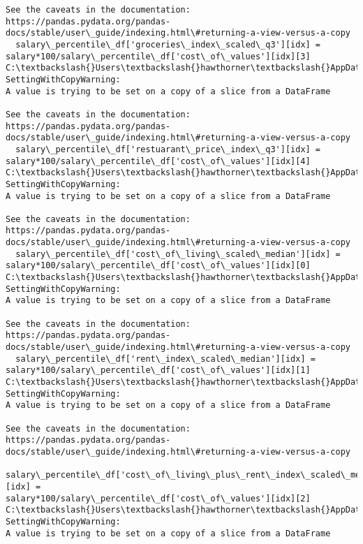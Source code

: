 \documentclass[11pt]{article}
\begin{document}
\begin{Verbatim}[commandchars=\\\{\}]
See the caveats in the documentation: https://pandas.pydata.org/pandas-
docs/stable/user\_guide/indexing.html\#returning-a-view-versus-a-copy
  salary\_percentile\_df['groceries\_index\_scaled\_q3'][idx] =
salary*100/salary\_percentile\_df['cost\_of\_values'][idx][3]
C:\textbackslash{}Users\textbackslash{}hawthorner\textbackslash{}AppData\textbackslash{}Local\textbackslash{}Temp\textbackslash{}ipykernel\_22188\textbackslash{}773068333.py:33:
SettingWithCopyWarning:
A value is trying to be set on a copy of a slice from a DataFrame

See the caveats in the documentation: https://pandas.pydata.org/pandas-
docs/stable/user\_guide/indexing.html\#returning-a-view-versus-a-copy
  salary\_percentile\_df['restuarant\_price\_index\_q3'][idx] =
salary*100/salary\_percentile\_df['cost\_of\_values'][idx][4]
C:\textbackslash{}Users\textbackslash{}hawthorner\textbackslash{}AppData\textbackslash{}Local\textbackslash{}Temp\textbackslash{}ipykernel\_22188\textbackslash{}773068333.py:37:
SettingWithCopyWarning:
A value is trying to be set on a copy of a slice from a DataFrame

See the caveats in the documentation: https://pandas.pydata.org/pandas-
docs/stable/user\_guide/indexing.html\#returning-a-view-versus-a-copy
  salary\_percentile\_df['cost\_of\_living\_scaled\_median'][idx] =
salary*100/salary\_percentile\_df['cost\_of\_values'][idx][0]
C:\textbackslash{}Users\textbackslash{}hawthorner\textbackslash{}AppData\textbackslash{}Local\textbackslash{}Temp\textbackslash{}ipykernel\_22188\textbackslash{}773068333.py:38:
SettingWithCopyWarning:
A value is trying to be set on a copy of a slice from a DataFrame

See the caveats in the documentation: https://pandas.pydata.org/pandas-
docs/stable/user\_guide/indexing.html\#returning-a-view-versus-a-copy
  salary\_percentile\_df['rent\_index\_scaled\_median'][idx] =
salary*100/salary\_percentile\_df['cost\_of\_values'][idx][1]
C:\textbackslash{}Users\textbackslash{}hawthorner\textbackslash{}AppData\textbackslash{}Local\textbackslash{}Temp\textbackslash{}ipykernel\_22188\textbackslash{}773068333.py:39:
SettingWithCopyWarning:
A value is trying to be set on a copy of a slice from a DataFrame

See the caveats in the documentation: https://pandas.pydata.org/pandas-
docs/stable/user\_guide/indexing.html\#returning-a-view-versus-a-copy
  salary\_percentile\_df['cost\_of\_living\_plus\_rent\_index\_scaled\_median'][idx] =
salary*100/salary\_percentile\_df['cost\_of\_values'][idx][2]
C:\textbackslash{}Users\textbackslash{}hawthorner\textbackslash{}AppData\textbackslash{}Local\textbackslash{}Temp\textbackslash{}ipykernel\_22188\textbackslash{}773068333.py:40:
SettingWithCopyWarning:
A value is trying to be set on a copy of a slice from a DataFrame


\end{Verbatim}
\end{document}
